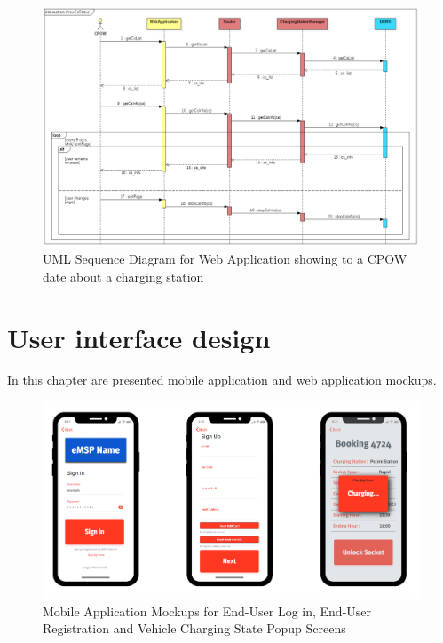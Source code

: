 \documentclass[a4paper]{report}
\begin{document}
\begin{landscape}
\begin{figure}[hp]
\centering
\includegraphics[scale=0.6]{img/sequenceShowCsStatus.png}
\caption{UML Sequence Diagram for Web Application showing to a CPOW date about a charging station}
\label{fig:seq-csStatus}
\end{figure}
\end{landscape}

\chapter{User interface design}
In this chapter are presented mobile application and web application mockups.

\begin{figure}[hp]
\centering
\includegraphics[scale=0.45]{img/mockups/MCKP1.png}
\caption{Mobile Application Mockups for End-User Log in, End-User Registration and Vehicle Charging State Popup Screens}
\label{fig:MobileApp-activity}
\end{figure}
\end{document}
